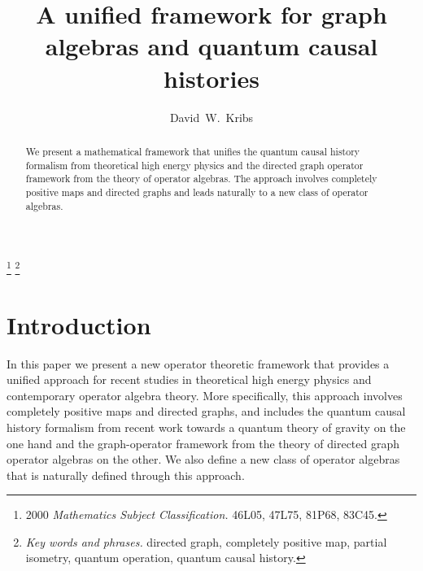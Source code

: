 \documentclass[12pt]{amsart}
\theoremstyle{plain}
\theoremstyle{definition}
\begin{document}
\title[]{A unified framework for graph algebras and quantum causal histories}
%
%
\author[D.W. Kribs]{David~W.~Kribs}
%
\address{Department of Mathematics and Statistics, University of
Guelph, Guelph, Ontario, Canada  N1G 2W1} \address{Institute for
Quantum Computing, University of Waterloo, Waterloo, ON, CANADA
N2L 3G1} \address{Perimeter Institute for Theoretical Physics, 31
Caroline St. N., Waterloo, ON, CANADA N2L 2Y5}
%
%
\begin{abstract}
We present a mathematical framework that unifies the quantum
causal history formalism from theoretical high energy physics and
the directed graph operator framework from the theory of operator
algebras. The approach involves completely positive maps and
directed graphs and leads naturally to a new class of operator
algebras.
\end{abstract}

\thanks{2000 {\it  Mathematics Subject Classification.} 46L05, 47L75, 81P68, 83C45.}
\thanks{{\it Key words and phrases.} directed graph, completely positive
map, partial isometry, quantum operation,  quantum causal
history.}
\maketitle




\section{Introduction}   \label{S:intro}


In this paper we present a new operator theoretic framework that
provides a unified approach for recent studies in theoretical high
energy physics and contemporary operator algebra theory. More
specifically, this approach involves completely positive maps and
directed graphs, and includes the quantum causal history formalism
from recent work towards a quantum theory of gravity on the one
hand and the graph-operator framework from the theory of directed
graph operator algebras on the other. We also define a new class
of operator algebras that is naturally defined through this
approach.
\end{document}
